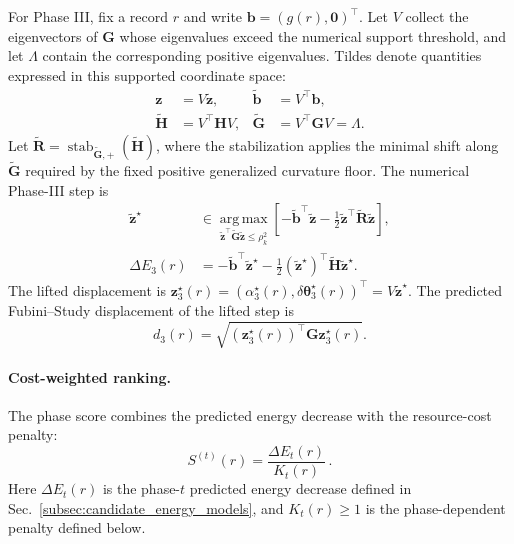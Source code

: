 \documentclass[
  reprint,
  amsmath,
  amssymb,
  aps,
  pra,
  nofootinbib,
  superscriptaddress,
  floatfix
]{revtex4-2}
\begin{document}
For Phase III, fix a record \(r\) and write
\(\mathbf b=(g(r),\mathbf 0)^{\top}\). Let \(V\) collect the eigenvectors of
\(\mathbf G\) whose eigenvalues exceed the numerical support threshold, and
let \(\Lambda\) contain the corresponding positive eigenvalues. Tildes denote
quantities expressed in this supported coordinate space:
\begin{equation}
\begin{aligned}
\mathbf z&=V\widetilde{\mathbf z},
&
\widetilde{\mathbf b}&=V^{\top}\mathbf b,\\
\widetilde{\mathbf H}&=V^{\top}\mathbf HV,
&
\widetilde{\mathbf G}&=V^{\top}\mathbf GV=\Lambda.
\end{aligned}
\label{eq:phase3_supported_blocks}
\end{equation}
Let
\(\widetilde{\mathbf R}
=\operatorname{stab}_{\widetilde{\mathbf G},+}
(\widetilde{\mathbf H})\), where the stabilization applies the minimal shift
along \(\widetilde{\mathbf G}\) required by the fixed positive generalized
curvature floor. The numerical Phase-III step is
\begin{equation}
\begin{aligned}
\widetilde{\mathbf z}^{\star}
&\in
\operatorname*{arg\,max}_{
\widetilde{\mathbf z}^{\top}\widetilde{\mathbf G}
\widetilde{\mathbf z}\le\rho_k^2}
\left[
-\widetilde{\mathbf b}^{\top}\widetilde{\mathbf z}
-\frac12\widetilde{\mathbf z}^{\top}
\widetilde{\mathbf R}\widetilde{\mathbf z}
\right],\\
\Delta E_3(r)
&=-\widetilde{\mathbf b}^{\top}\widetilde{\mathbf z}^{\star}
-\frac12(\widetilde{\mathbf z}^{\star})^{\top}
\widetilde{\mathbf H}\widetilde{\mathbf z}^{\star}.
\end{aligned}
\label{eq:phase3_joint_gain}
\end{equation}
The lifted displacement is
\(\mathbf z_3^\star(r)
=(\alpha_3^\star(r),\delta\boldsymbol\theta_3^\star(r))^{\top}
=V\widetilde{\mathbf z}^{\star}\).
The predicted Fubini--Study displacement of the lifted step is
\begin{equation}
d_3(r)
=
\sqrt{
(\mathbf z_3^\star(r))^{\top}
\mathbf G
\mathbf z_3^\star(r)
}.
\label{eq:phase3_geometry}
\end{equation}

\paragraph*{Cost-weighted ranking.}
\label{subsec:cost_weighted_record_ranking}
%
The phase score combines the predicted energy decrease with the resource-cost
penalty:
\begin{equation}
S^{(t)}(r)
=
\frac{\Delta E_t(r)}{K_t(r)}\,.
\label{eq:master_phase_score}
\end{equation}
Here \(\Delta E_t(r)\) is the phase-\(t\) predicted energy decrease defined in
Sec.~\ref{subsec:candidate_energy_models}, and \(K_t(r)\geq1\) is the
phase-dependent penalty defined below.
\end{document}
